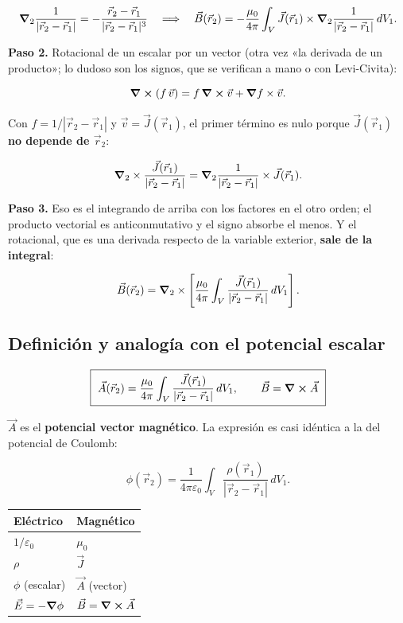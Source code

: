 \documentclass[12pt,a4paper]{article}
\begin{document}
\[
\vnabla_2\frac{1}{|\vec r_2-\vec r_1|} = -\frac{\vec r_2-\vec r_1}{|\vec r_2-\vec r_1|^3}
\quad\Longrightarrow\quad
\vec B(\vec r_2) = -\frac{\mu_0}{4\pi}\int_V \vec J(\vec r_1)\times
\vnabla_2\frac{1}{|\vec r_2-\vec r_1|}\,dV_1 .
\]

\textbf{Paso 2.} Rotacional de un escalar por un vector (otra vez «la derivada de un
producto»; lo dudoso son los signos, que se verifican a mano o con
Levi-Civita):

\[
\curl (f\,\vec v) = f\,\curl \vec v + \vnabla f\times\vec v .
\]

Con $f = 1/|\vec r_2-\vec r_1|$ y $\vec v = \vec J(\vec r_1)$, el primer
término es nulo porque $\vec J(\vec r_1)$ \textbf{no depende de $\vec r_2$}:

\[
\vnabla_2\times\frac{\vec J(\vec r_1)}{|\vec r_2-\vec r_1|}
= \vnabla_2\frac{1}{|\vec r_2-\vec r_1|}\times\vec J(\vec r_1).
\]

\textbf{Paso 3.} Eso es el integrando de arriba con los factores en el otro orden;
el producto vectorial es anticonmutativo y el signo absorbe el menos. Y el
rotacional, que es una derivada respecto de la variable exterior, \textbf{sale de la
integral}:

\[
\vec B(\vec r_2) = \vnabla_2\times\left[\frac{\mu_0}{4\pi}\int_V
\frac{\vec J(\vec r_1)}{|\vec r_2-\vec r_1|}\,dV_1\right].
\]

\subsection{Definición y analogía con el potencial escalar}

\begin{keybox}
\[
\boxed{\ \vec A(\vec r_2) = \frac{\mu_0}{4\pi}\int_V
\frac{\vec J(\vec r_1)}{|\vec r_2-\vec r_1|}\,dV_1,
\qquad \vec B = \curl \vec A\ }
\]
\end{keybox}

$\vec A$ es el \textbf{potencial vector magnético}. La expresión es casi idéntica a
la del potencial de Coulomb:

\[
\phi(\vec r_2) = \frac{1}{4\pi\varepsilon_0}\int_V
\frac{\rho(\vec r_1)}{|\vec r_2-\vec r_1|}\,dV_1 .
\]

\begin{center}
\renewcommand{\arraystretch}{1.35}
\small
\begin{tabularx}{\textwidth}{l>{\raggedright\arraybackslash}X}
\toprule
\textbf{Eléctrico} & \textbf{Magnético} \\
\midrule
$1/\varepsilon_0$ & $\mu_0$ \\
$\rho$ & $\vec J$ \\
$\phi$ (escalar) & $\vec A$ (vector) \\
$\vec E = -\vnabla\phi$ & $\vec B = \curl \vec A$ \\
\bottomrule
\end{tabularx}
\end{center}
\end{document}
